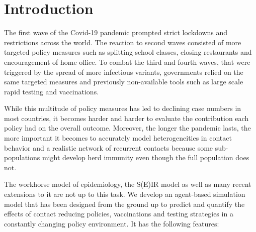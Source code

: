 \section{Introduction}
\label{sec:introduction}

The first wave of the Covid-19 pandemic prompted strict lockdowns and restrictions
across the world. The reaction to second waves consisted of more targeted policy measures such as splitting school classes, closing restaurants and encouragement of home office. To combat the third and fourth waves, that were triggered by the spread of more infectious variants, governments relied on the same targeted measures and previously non-available tools such as large scale rapid testing and vaccinations.

While this multitude of policy measures has led to declining case numbers in most countries, it becomes harder and harder to evaluate the contribution each policy had on the overall outcome. Moreover, the longer the pandemic lasts, the more important it becomes to accurately model heterogeneities in contact behavior and a realistic network of recurrent contacts because some sub-populations might develop herd immunity even though the full population does not.

The workhorse model of epidemiology, the S(E)IR model as well as many recent extensions to it are not up to this task. We develop an agent-based simulation model that has been designed from the ground up to predict and quantify the effects of contact reducing policies, vaccinations and testing strategies in a constantly changing policy environment. It has the following features:

